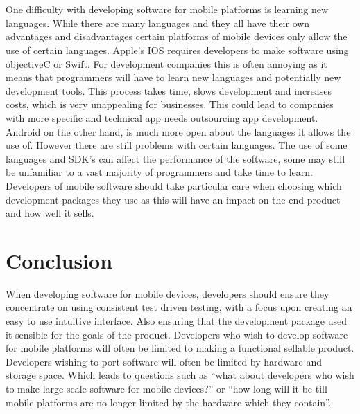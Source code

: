 \documentclass{scrartcl}
\begin{document}
\section{}
One difficulty with developing software for mobile platforms is learning new languages. While there are many languages and they all have their own advantages and disadvantages certain platforms of mobile devices only allow the use of certain languages. Apple’s IOS requires developers to make software using objectiveC or Swift. For development companies this is often annoying as it means that programmers will have to learn new languages and potentially new development tools. This process takes time, slows development and increases costs, which is very unappealing for businesses. This could lead to companies with more specific and technical app needs outsourcing app development. 
Android on the other hand, is much more open about the languages it allows the use of. However there are still problems with certain languages. The use of some languages and SDK’s can affect the performance of the software, some may still be unfamiliar to a vast majority of programmers and take time to learn. 
Developers of mobile software should take particular care when choosing which development packages they use as this will have an impact on the end product and how well it sells.




\section{Conclusion}
When developing software for mobile devices, developers should ensure they concentrate on using consistent test driven testing, with a focus upon creating an easy to use intuitive interface. Also ensuring that the development package used it sensible for the goals of the product. Developers who wish to develop software for mobile platforms will often be limited to making a functional sellable product. Developers wishing to port software will often be limited by hardware and storage space. Which leads to questions such as “what about developers who wish to make large scale software for mobile devices?” or “how long will it be till mobile platforms are no longer limited by the hardware which they contain”. 



\end{document}
